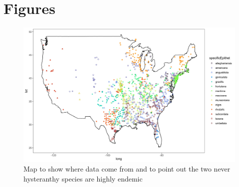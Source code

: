 \documentclass{article}[11pt]
\begin{document}

\noindent  


 




\newpage
\section*{Figures}
    \begin{figure}[h!]
    \centering
 \includegraphics[width=\textwidth]{..//..//Plots/map.jpeg}
    \caption{Map to show where data come from and to point out the two never hysteranthy species are highly endemic}
    \label{fig:mappy}
\end{figure}

\end{document}
